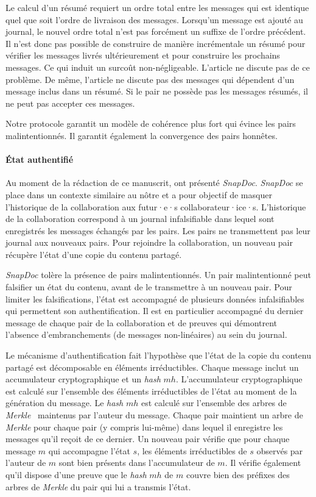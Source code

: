 Le calcul d'un résumé requiert un ordre total entre les messages qui est identique quel que soit l'ordre de livraison des messages.
Lorsqu'un message est ajouté au journal, le nouvel ordre total n'est pas forcément un suffixe de l'ordre précédent.
Il n'est donc pas possible de construire de manière incrémentale un résumé pour vérifier les messages livrés ultérieurement et pour construire les prochains messages.
Ce qui induit un surcoût non-négligeable.
L'article ne discute pas de ce problème.
De même, l'article ne discute pas des messages qui dépendent d'un message inclus dans un résumé.
Si le pair ne possède pas les messages résumés, il ne peut pas accepter ces messages.

Notre protocole garantit un modèle de cohérence plus fort qui évince les pairs malintentionnés.
Il garantit également la convergence des pairs honnêtes.


\paragraph{État authentifié} Au moment de la rédaction de ce manuscrit, \textcite{kollmann2019_snapdoc} ont présenté \emph{SnapDoc}.
\emph{SnapDoc} se place dans un contexte similaire au nôtre et a pour objectif de masquer l'historique de la collaboration aux futur·e·s collaborateur·ice·s.
L'historique de la collaboration correspond à un journal infalsifiable dans lequel sont enregistrés les messages échangés par les pairs.
Les pairs ne transmettent pas leur journal aux nouveaux pairs.
Pour rejoindre la collaboration, un nouveau pair récupère l'état d'une copie du contenu partagé.

\emph{SnapDoc} tolère la présence de pairs malintentionnés.
Un pair malintentionné peut falsifier un état du contenu, avant de le transmettre à un nouveau pair.
Pour limiter les falsifications, l'état est accompagné de plusieurs données infalsifiables qui permettent son authentification.
Il est en particulier accompagné du dernier message de chaque pair de la collaboration et de preuves qui démontrent l'absence d'embranchements (de messages non-linéaires) au sein du journal.

Le mécanisme d'authentification fait l'hypothèse que l'état de la copie du contenu partagé est décomposable en éléments irréductibles.
Chaque message inclut un accumulateur cryptographique et un \emph{hash} $mh$.
L'accumulateur cryptographique est calculé sur l'ensemble des éléments irréductibles de l'état au moment de la génération du message.
Le \emph{hash} $mh$ est calculé sur l'ensemble des arbres de \emph{Merkle}~\autocite{merkle_1979_merkletree} maintenus par l'auteur du message.
Chaque pair maintient un arbre de \emph{Merkle} pour chaque pair (y compris lui-même) dans lequel il enregistre les messages qu'il reçoit de ce dernier.
%
Un nouveau pair vérifie que pour chaque message $m$ qui accompagne l'état $s$, les éléments irréductibles de $s$ observés par l'auteur de $m$ sont bien présents dans l'accumulateur de $m$.
Il vérifie également qu'il dispose d'une preuve que le \emph{hash} $mh$ de $m$ couvre bien des préfixes des arbres de \emph{Merkle} du pair qui lui a transmis l'état.

